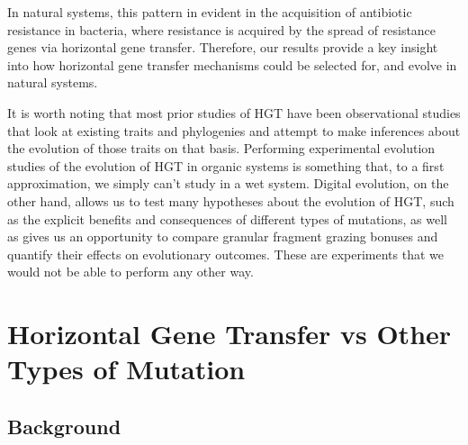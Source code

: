 \documentclass[PhD]{msu-thesis}
\begin{document}
In natural systems, this pattern in evident in the acquisition of antibiotic resistance in bacteria, where resistance is acquired by the spread of resistance genes via horizontal gene transfer. Therefore, our results provide a key insight into how horizontal gene transfer mechanisms could be selected for, and evolve in natural systems.

It is worth noting that most prior studies of HGT have been observational studies that look at existing traits and phylogenies and attempt to make inferences about the evolution of those traits on that basis. Performing experimental evolution studies of the evolution of HGT in organic systems is something that, to a first approximation, we simply can't study in a wet system. Digital evolution, on the other hand, allows us to test many hypotheses about the evolution of HGT, such as the explicit benefits and consequences of different types of mutations, as well as gives us an opportunity to compare granular fragment grazing bonuses and quantify their effects on evolutionary outcomes. These are experiments that we would not be able to perform any other way.   


\chapter{Horizontal Gene Transfer vs Other Types of Mutation}
\label{chap:hgt-preferred}
\section{Background}
\end{document}
